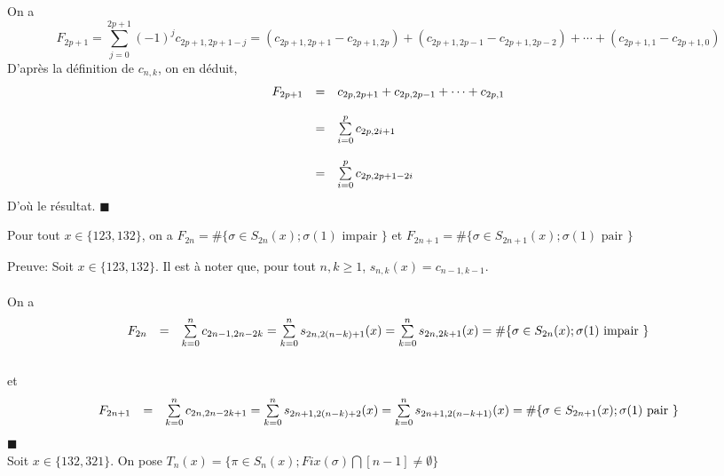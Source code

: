 	On a \[
		F_{2p+1}=\sum\limits_{j=0}^{2p+1}(-1)^{j}c_{2p+1, 2p+1-j}=(c_{2p+1, 2p+1} - c_{2p+1, 2p}) + (c_{2p+1, 2p-1} - c_{2p+1, 2p-2})+ \cdots + (c_{2p+1, 1} - c_{2p+1, 0})
	\]
	D'après la définition de $c_{n, k}$, on en déduit,
	\[
		\begin{array}{l l l}
			F_{2p+1} & =        & c_{2p, 2p+1} + c_{2p, 2p-1} + \cdots + c_{2p, 1} \\
			         & \text{ } &                                                  \\
			         & =        & \sum\limits_{i=0}^{p}c_{2p,2i+1}                 \\
			         & \text{ } &                                                  \\
			         & =        & \sum\limits_{i=0}^{p}c_{2p, 2p+1-2i}
		\end{array}
	\]
	D'où le résultat. \hspace{5pt} $\blacksquare$
	\text{ }\vspace{5pt}\\
	\begin{corollaire}
		Pour tout $x \in \{123, 132\}$, on a $F_{2n}=\#\{ \sigma \in S_{2n}(x); \sigma(1) \text{ impair }\}$ et $F_{2n+1} = \#\{\sigma\in S_{2n+1}(x); \sigma(1) \text{ pair }\}$
	\end{corollaire}
	Preuve: Soit $x \in \{123, 132\}$.
	Il est à noter que, pour tout $n, k\geq 1$, $s_{n, k}(x) = c_{n-1,k-1}$. \\ \text{}\vspace{5pt}\\
	On a \\
	\[
		\begin{array}{l l l}
			F_{2n} & = & \sum\limits_{k=0}^{n}c_{2n-1, 2n-2k} = \sum\limits_{k=0}^{n}s_{2n, 2(n-k)+1}(x) = \sum\limits_{k=0}^{n}s_{2n, 2k+1}(x) = \#\{\sigma\in S_{2n}(x); \sigma(1) \text{ impair }\}
		\end{array}
	\]
	\text{}\\
	et
	\[
		\begin{array}{l l l}
			F_{2n+1} & = & \sum\limits_{k=0}^{n}c_{2n, 2n-2k+1} = \sum\limits_{k=0}^{n}s_{2n+1, 2(n-k)+2}(x) = \sum\limits_{k=0}^{n}s_{2n+1, 2(n-k+1)}(x) = \#\{\sigma\in S_{2n+1}(x); \sigma(1) \text{ pair }\}
		\end{array}
	\]
$\blacksquare$\vspace{10pt}\\
	Soit $x \in \{132, 321\}$. On pose $T_{n}(x)= \{\pi \in S_{n}(x); Fix(\sigma)\bigcap [n-1]\neq \emptyset\}$\vspace{5pt} \\
